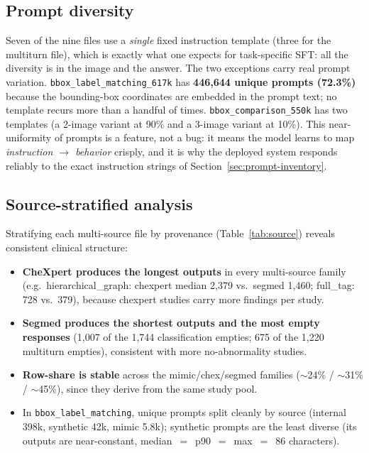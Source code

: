 \documentclass[11pt,a4paper]{article}
\begin{document}
\subsection{Prompt diversity}
Seven of the nine files use a \emph{single} fixed instruction template (three for the multiturn file), which is exactly what one expects for task-specific SFT: all the diversity is in the image and the answer. The two exceptions carry real prompt variation. \texttt{bbox\_label\_matching\_617k} has \textbf{446{,}644 unique prompts (72.3\%)} because the bounding-box coordinates are embedded in the prompt text; no template recurs more than a handful of times. \texttt{bbox\_comparison\_550k} has two templates (a 2-image variant at 90\% and a 3-image variant at 10\%). This near-uniformity of prompts is a feature, not a bug: it means the model learns to map \emph{instruction $\rightarrow$ behavior} crisply, and it is why the deployed system responds reliably to the exact instruction strings of Section~\ref{sec:prompt-inventory}.

\subsection{Source-stratified analysis}
Stratifying each multi-source file by provenance (Table~\ref{tab:source}) reveals consistent clinical structure:
\begin{itemize}[leftmargin=1.4em]
  \item \textbf{CheXpert produces the longest outputs} in every multi-source family (e.g.\ hierarchical\_graph: chexpert median 2{,}379 vs.\ segmed 1{,}460; full\_tag: 728 vs.\ 379), because chexpert studies carry more findings per study.
  \item \textbf{Segmed produces the shortest outputs and the most empty responses} (1{,}007 of the 1{,}744 classification empties; 675 of the 1{,}220 multiturn empties), consistent with more no-abnormality studies.
  \item \textbf{Row-share is stable} across the mimic/chex/segmed families ($\sim$24\% / $\sim$31\% / $\sim$45\%), since they derive from the same study pool.
  \item In \texttt{bbox\_label\_matching}, unique prompts split cleanly by source (internal 398k, synthetic 42k, mimic 5.8k); synthetic prompts are the least diverse (its outputs are near-constant, median~$=$~p90~$=$~max~$=$~86 characters).
\end{itemize}
\end{document}
